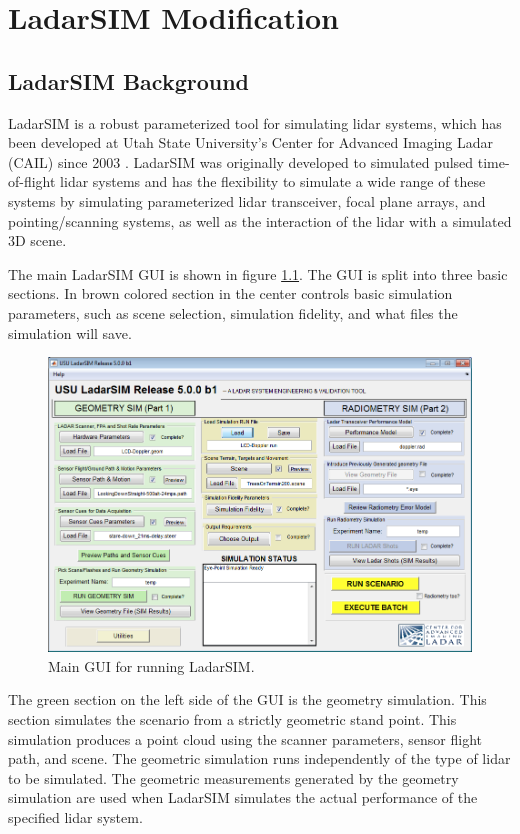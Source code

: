 \chapter{LadarSIM Modification}

\section{LadarSIM Background}

LadarSIM is a robust parameterized tool for simulating lidar systems, which has been
developed at Utah State University's Center for Advanced Imaging Ladar (CAIL) since 2003
\cite{budgeLeishman,neilsenBudge}. LadarSIM was originally developed to simulated pulsed 
time-of-flight lidar systems and has the flexibility to simulate
a wide range of these systems by simulating parameterized lidar transceiver, focal plane 
arrays, and pointing/scanning systems, as well as the interaction of the lidar with a 
simulated 3D scene. 

The main LadarSIM GUI is shown in figure \ref{fig:LadarSIM}. The GUI is split into three basic 
sections. In brown colored section in the center controls basic simulation parameters, such as
scene selection, simulation fidelity, and what files the simulation will save. 
\begin{figure}[!htb]
	\centering
	\includegraphics[width=.8\columnwidth]{figs/LadarSIM}
	\vspace{1em}
	\caption{Main GUI for running LadarSIM.}
	\label{fig:LadarSIM}
\end{figure}

The green section on the left side of the GUI is the geometry simulation. This section simulates
the scenario from a strictly geometric stand point. This simulation produces a point cloud using 
the scanner parameters, sensor flight path, and scene. The geometric simulation runs independently
of the type of lidar to be simulated. The geometric measurements generated by the geometry simulation
are used when LadarSIM simulates the actual performance of the specified lidar system. 

